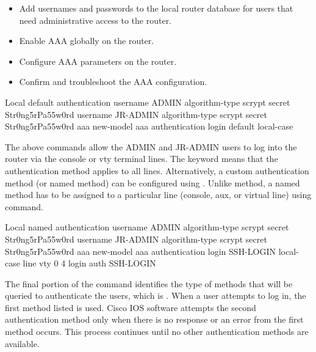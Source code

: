 \begin{itemize}
  \item Add usernames and passwords to the local router database for users that need administrative access to the router.
  \item Enable AAA globally on the router.
  \item Configure AAA parameters on the router.
  \item Confirm and troubleshoot the AAA configuration.  
\end{itemize}

\begin{sexylisting}{Local default authentication}
username ADMIN algorithm-type scrypt secret Str0ng5rPa55w0rd
username JR-ADMIN algorithm-type scrypt secret Str0ng5rPa55w0rd
aaa new-model
aaa authentication login default local-case
\end{sexylisting}

The above commands allow the ADMIN and JR-ADMIN users to log into the router via the console or vty terminal lines. The  keyword means that the authentication method applies to all lines. Alternatively, a custom authentication method (or named method) can be configured using . Unlike  method, a named method has to be assigned to a particular line (console, aux, or virtual line) using  command.\\ 

\begin{sexylisting}{Local named authentication}
  username ADMIN algorithm-type scrypt secret Str0ng5rPa55w0rd
  username JR-ADMIN algorithm-type scrypt secret Str0ng5rPa55w0rd
  aaa new-model
  aaa authentication login SSH-LOGIN local-case
  line vty 0 4
  login auth SSH-LOGIN
  \end{sexylisting}

The final portion of the  command identifies the type of methods that will be queried to authenticate the users, which is . When a user attempts to log in, the first method listed is used. Cisco IOS software attempts the second authentication method only when there is no response or an error from the first method occurs. This process continues until no other authentication methods are available.\\


